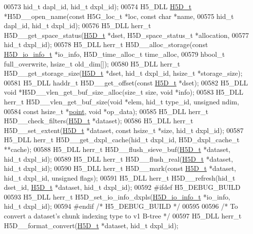 \begin{DoxyCode}
00573     hid\_t dapl\_id, hid\_t dxpl\_id);
00574 H5\_DLL \hyperlink{struct_h5_d__t}{H5D\_t} *H5D\_\_open\_name(\textcolor{keyword}{const} H5G\_loc\_t *loc, \textcolor{keyword}{const} \textcolor{keywordtype}{char} *name,
00575     hid\_t dapl\_id, hid\_t dxpl\_id);
00576 H5\_DLL herr\_t H5D\_\_get\_space\_status(\hyperlink{struct_h5_d__t}{H5D\_t} *dset, H5D\_space\_status\_t *allocation,
00577     hid\_t dxpl\_id);
00578 H5\_DLL herr\_t H5D\_\_alloc\_storage(\textcolor{keyword}{const} \hyperlink{struct_h5_d__io__info__t}{H5D\_io\_info\_t} *io\_info, H5D\_time\_alloc\_t time\_alloc,
00579     hbool\_t full\_overwrite, hsize\_t old\_dim[]);
00580 H5\_DLL herr\_t H5D\_\_get\_storage\_size(\hyperlink{struct_h5_d__t}{H5D\_t} *dset, hid\_t dxpl\_id, hsize\_t *storage\_size);
00581 H5\_DLL haddr\_t H5D\_\_get\_offset(\textcolor{keyword}{const} \hyperlink{struct_h5_d__t}{H5D\_t} *dset);
00582 H5\_DLL \textcolor{keywordtype}{void} *H5D\_\_vlen\_get\_buf\_size\_alloc(\textcolor{keywordtype}{size\_t} size, \textcolor{keywordtype}{void} *info);
00583 H5\_DLL herr\_t H5D\_\_vlen\_get\_buf\_size(\textcolor{keywordtype}{void} *elem, hid\_t type\_id, \textcolor{keywordtype}{unsigned} ndim,
00584     \textcolor{keyword}{const} hsize\_t *\hyperlink{structpoint}{point}, \textcolor{keywordtype}{void} *op\_data);
00585 H5\_DLL herr\_t H5D\_\_check\_filters(\hyperlink{struct_h5_d__t}{H5D\_t} *dataset);
00586 H5\_DLL herr\_t H5D\_\_set\_extent(\hyperlink{struct_h5_d__t}{H5D\_t} *dataset, \textcolor{keyword}{const} hsize\_t *size, hid\_t dxpl\_id);
00587 H5\_DLL herr\_t H5D\_\_get\_dxpl\_cache(hid\_t dxpl\_id, H5D\_dxpl\_cache\_t **cache);
00588 H5\_DLL herr\_t H5D\_\_flush\_sieve\_buf(\hyperlink{struct_h5_d__t}{H5D\_t} *dataset, hid\_t dxpl\_id);
00589 H5\_DLL herr\_t H5D\_\_flush\_real(\hyperlink{struct_h5_d__t}{H5D\_t} *dataset, hid\_t dxpl\_id);
00590 H5\_DLL herr\_t H5D\_\_mark(\textcolor{keyword}{const} \hyperlink{struct_h5_d__t}{H5D\_t} *dataset, hid\_t dxpl\_id, \textcolor{keywordtype}{unsigned} flags);
00591 H5\_DLL herr\_t H5D\_\_refresh(hid\_t dset\_id, \hyperlink{struct_h5_d__t}{H5D\_t} *dataset, hid\_t dxpl\_id);
00592 \textcolor{preprocessor}{#ifdef H5\_DEBUG\_BUILD}
00593 H5\_DLL herr\_t H5D\_set\_io\_info\_dxpls(\hyperlink{struct_h5_d__io__info__t}{H5D\_io\_info\_t} *io\_info, hid\_t dxpl\_id);
00594 \textcolor{preprocessor}{#endif }\textcolor{comment}{/* H5\_DEBUG\_BUILD */}\textcolor{preprocessor}{}
00595 
00596 \textcolor{comment}{/* To convert a dataset's chunk indexing type to v1 B-tree */}
00597 H5\_DLL herr\_t H5D\_\_format\_convert(\hyperlink{struct_h5_d__t}{H5D\_t} *dataset, hid\_t dxpl\_id);

\end{DoxyCode}
